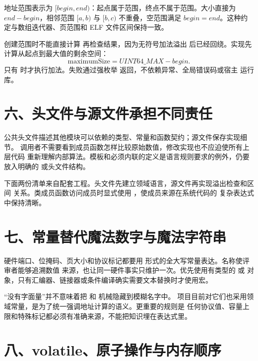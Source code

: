 地址范围表示为 \([begin,end)\)：起点属于范围，终点不属于范围。大小直接为
\(end-begin\)，相邻范围 \([a,b)\) 与 \([b,c)\) 不重叠，空范围满足
\(begin=end\)。这种约定与数组迭代器、页范围和 ELF 文件区间保持一致。

创建范围时不能直接计算  再检查结果，因为无符号加法溢出
后已经回绕。实现先计算从起点到最大值的剩余空间：
\[
  \mathrm{maximumSize}=UINT64\_MAX-begin.
\]
只有  时才执行加法。失败通过强枚举
 返回，不依赖异常、全局错误码或宿主
运行库。

\section{六、头文件与源文件承担不同责任}

公共头文件描述其他模块可以依赖的类型、常量和函数契约；源文件保存实现细节。
调用者不需要看到成员函数怎样比较原始数值，修改实现也不应迫使所有上层代码
重新理解内部算法。模板和必须内联的定义是语言规则要求的例外，仍要放入明确的
 或头文件结构。

下面两份清单来自配套工程。头文件先建立领域语言，源文件再实现溢出检查和区间
关系。类成员函数访问成员时显式使用 ，使成员来源在系统代码的
复杂表达式中保持清晰。





\section{七、常量替代魔法数字与魔法字符串}

硬件端口、位掩码、页大小和协议标记都要用
 形式的全大写常量表达。名称使评审者能够追溯数值
来源，也让同一硬件事实只维护一次。优先使用有类型的  或
 对象，只有汇编器、链接器或条件编译确实需要文本替换时才使用宏。

“没有字面量”并不意味着把  和  机械隐藏到模糊名字中。
项目目前对它们也采用领域常量，是为了统一强调地址计算的语义。更重要的规则是
任何协议值、容量上限和特殊标记都必须有准确来源，不能把知识埋在表达式里。

\section{八、volatile、原子操作与内存顺序}

